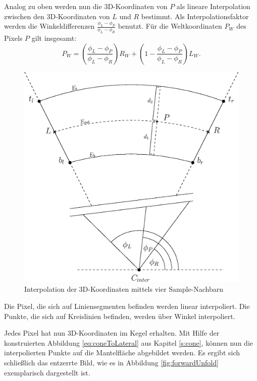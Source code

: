 Analog zu oben werden nun die 3D-Koordinaten von $P$ als lineare Interpolation zwischen den 3D-Koordinaten von $L$ und $R$ bestimmt. Als Interpolationsfaktor werden die Winkeldifferenzen
$\frac{\phi_L - \phi_P}{\phi_L - \phi_R}$ benutzt. Für die Weltkoordinaten $P_W$ des Pixels $P$ gilt insgesamt:
\[
P_W = \left(\frac{\phi_L - \phi_P}{\phi_L - \phi_R}\right) R_W + \left(1 - \frac{\phi_L - \phi_P}{\phi_L - \phi_R}\right) L_W.
\]

\begin{figure}[!htb]
	\centering
	\includegraphics[scale=.6]{images/radialInterpolation.eps}
	\caption{Interpolation der 3D-Koordinaten mittels vier Sample-Nachbarn}
	\label{fig:radialInterpolation}
\end{figure}

Die Pixel, die sich auf Liniensegmenten befinden werden linear interpoliert. Die Punkte, die sich auf Kreislinien befinden, werden über Winkel interpoliert.

Jedes Pixel hat nun 3D-Koordinaten im Kegel erhalten. Mit Hilfe der konstruierten Abbildung \ref{eq:coneToLateral} aus Kapitel \ref{s:cone}, können nun die interpolierten Punkte auf die Mantelfläche abgebildet werden. Es ergibt sich schließlich das entzerrte Bild, wie es in Abbildung \ref{fig:forwardUnfold} exemplarisch dargestellt ist.



